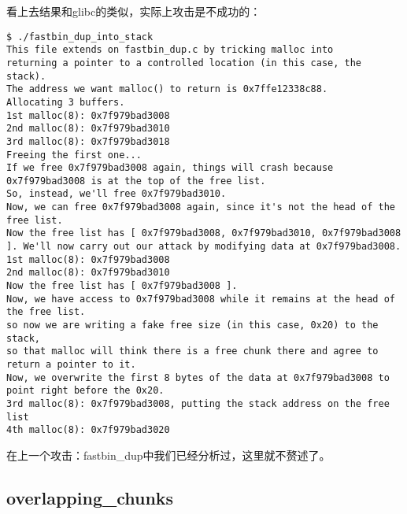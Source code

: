 看上去结果和glibc的类似，实际上攻击是不成功的：
\begin{verbatim}
$ ./fastbin_dup_into_stack 
This file extends on fastbin_dup.c by tricking malloc into
returning a pointer to a controlled location (in this case, the stack).
The address we want malloc() to return is 0x7ffe12338c88.
Allocating 3 buffers.
1st malloc(8): 0x7f979bad3008
2nd malloc(8): 0x7f979bad3010
3rd malloc(8): 0x7f979bad3018
Freeing the first one...
If we free 0x7f979bad3008 again, things will crash because 0x7f979bad3008 is at the top of the free list.
So, instead, we'll free 0x7f979bad3010.
Now, we can free 0x7f979bad3008 again, since it's not the head of the free list.
Now the free list has [ 0x7f979bad3008, 0x7f979bad3010, 0x7f979bad3008 ]. We'll now carry out our attack by modifying data at 0x7f979bad3008.
1st malloc(8): 0x7f979bad3008
2nd malloc(8): 0x7f979bad3010
Now the free list has [ 0x7f979bad3008 ].
Now, we have access to 0x7f979bad3008 while it remains at the head of the free list.
so now we are writing a fake free size (in this case, 0x20) to the stack,
so that malloc will think there is a free chunk there and agree to
return a pointer to it.
Now, we overwrite the first 8 bytes of the data at 0x7f979bad3008 to point right before the 0x20.
3rd malloc(8): 0x7f979bad3008, putting the stack address on the free list
4th malloc(8): 0x7f979bad3020

\end{verbatim}

在上一个攻击：fastbin\_dup中我们已经分析过，这里就不赘述了。

\subsection{overlapping\_chunks}

